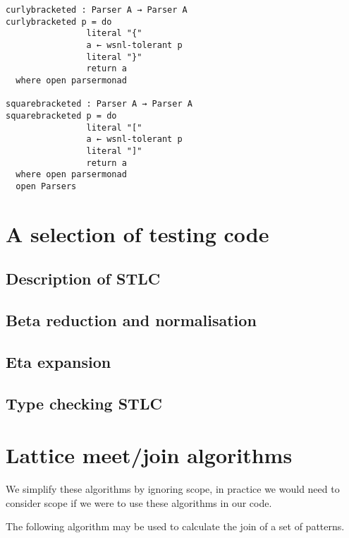 \begin{appendices}
\begin{verbatim}
curlybracketed : Parser A → Parser A
curlybracketed p = do
                literal "{"
                a ← wsnl-tolerant p
                literal "}"
                return a
  where open parsermonad

squarebracketed : Parser A → Parser A
squarebracketed p = do
                literal "["
                a ← wsnl-tolerant p
                literal "]"
                return a
  where open parsermonad
  open Parsers
\end{verbatim}

\section{A selection of testing code}
\label{appendix-tests}

\subsection{Description of STLC}


\subsection{Beta reduction and normalisation}


\subsection{Eta expansion}


\subsection{Type checking STLC}

\clearpage
\section{Lattice meet/join algorithms}
\label{appendix-joinalgorithms}

We simplify these algorithms by ignoring scope, in practice we would
need to consider scope if we were to use these algorithms in our code.

The following algorithm may be used to calculate the join of a set
of patterns.


\end{appendices}
